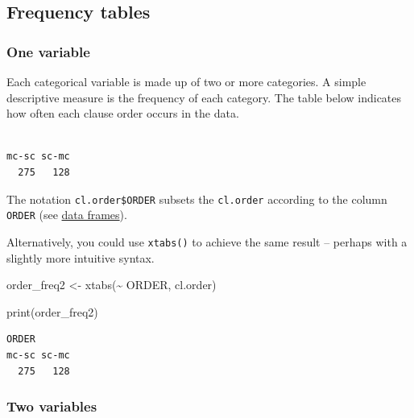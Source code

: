 \documentclass[
  11pt,
  letterpaper,
  DIV=11,
  numbers=noendperiod]{scrreprt}
\newenvironment{Shaded}{\begin{snugshade}}{\end{snugshade}}
\newcommand{\FunctionTok}[1]{\textcolor[rgb]{0.28,0.35,0.67}{#1}}
\newcommand{\NormalTok}[1]{\textcolor[rgb]{0.00,0.23,0.31}{#1}}
\newcommand{\OtherTok}[1]{\textcolor[rgb]{0.00,0.23,0.31}{#1}}
\newcommand{\SpecialCharTok}[1]{\textcolor[rgb]{0.37,0.37,0.37}{#1}}
\begin{document}
\subsection{Frequency tables}\label{frequency-tables}

\subsubsection{One variable}\label{one-variable}

Each categorical variable is made up of two or more categories. A simple
descriptive measure is the frequency of each category. The table below
indicates how often each clause order occurs in the data.

\begin{Shaded}
\end{Shaded}

\begin{verbatim}

mc-sc sc-mc 
  275   128 
\end{verbatim}

The notation \texttt{cl.order\$ORDER} subsets the \texttt{cl.order}
according to the column \texttt{ORDER} (see \href{Data_frames.qmd}{data
frames}).

Alternatively, you could use \texttt{xtabs()} to achieve the same result
-- perhaps with a slightly more intuitive syntax.

\begin{Shaded}
\begin{Highlighting}[]
\NormalTok{order\_freq2 }\OtherTok{\textless{}{-}} \FunctionTok{xtabs}\NormalTok{(}\SpecialCharTok{\textasciitilde{}}\NormalTok{ ORDER, cl.order)}

\FunctionTok{print}\NormalTok{(order\_freq2)}
\end{Highlighting}
\end{Shaded}

\begin{verbatim}
ORDER
mc-sc sc-mc 
  275   128 
\end{verbatim}

\subsubsection{Two variables}\label{two-variables}
\end{document}
